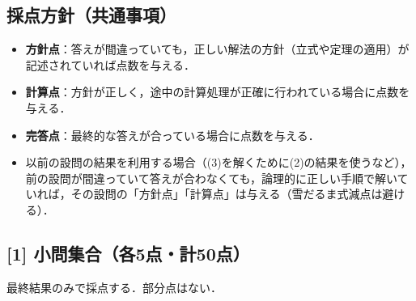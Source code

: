 \documentclass[dvipdfmx]{jlreq}
\theoremstyle{definition}
\begin{document}
\subsection*{採点方針（共通事項）}
\begin{itemize}
    \item \textbf{方針点}：答えが間違っていても，正しい解法の方針（立式や定理の適用）が記述されていれば点数を与える．
    \item \textbf{計算点}：方針が正しく，途中の計算処理が正確に行われている場合に点数を与える．
    \item \textbf{完答点}：最終的な答えが合っている場合に点数を与える．
    \item 以前の設問の結果を利用する場合（(3)を解くために(2)の結果を使うなど），前の設問が間違っていて答えが合わなくても，論理的に正しい手順で解いていれば，その設問の「方針点」「計算点」は与える（雪だるま式減点は避ける）．
\end{itemize}

\subsection*{[1] 小問集合（各5点・計50点）}
最終結果のみで採点する．部分点はない．
\end{document}
